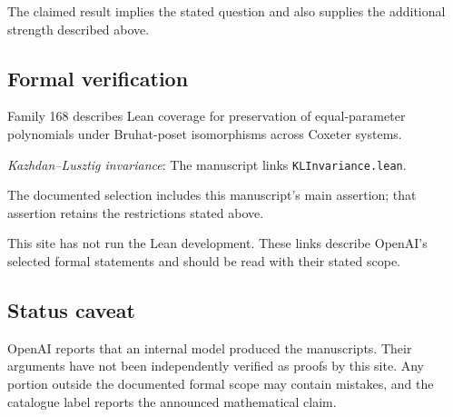 \documentclass[11pt]{article}
\begin{document}
The claimed result implies the stated question and also supplies the additional strength described above.

\subsection{Formal verification}
Family 168 describes Lean coverage for preservation of equal-parameter polynomials under Bruhat-poset isomorphisms across Coxeter systems.

\textit{Kazhdan--Lusztig invariance}: The manuscript links \texttt{KLInvariance.lean}.

The documented selection includes this manuscript’s main assertion; that assertion retains the restrictions stated above.

This site has not run the Lean development. These links describe OpenAI’s selected formal statements and should be read with their stated scope.

\subsection{Status caveat}
OpenAI reports that an internal model produced the manuscripts. Their arguments have not been independently verified as proofs by this site. Any portion outside the documented formal scope may contain mistakes, and the catalogue label reports the announced mathematical claim.
\end{document}
